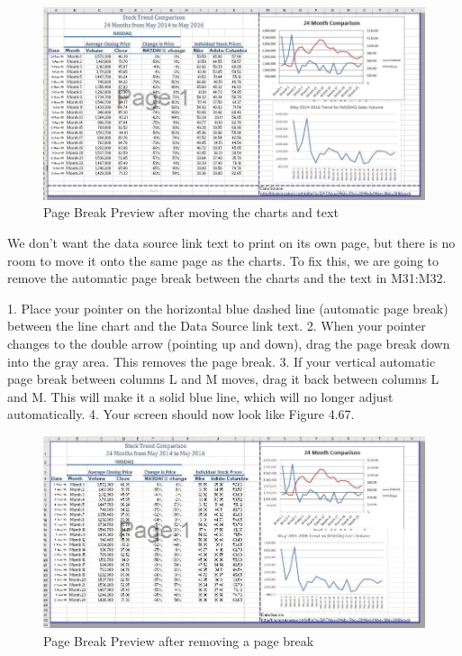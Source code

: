 \begin{figure}[H]
	\centering
	\includegraphics[width=\maxwidth{.95\linewidth}]{gfx/ch04_fig53}
	\caption{Page Break Preview after moving the charts and text}
	\label{04:fig53}
\end{figure}




We don’t want the data source link text to print on its own page, but there is no room to move it onto
the same page as the charts. To fix this, we are going to remove the automatic page break between the
charts and the text in M31:M32.

1. Place your pointer on the horizontal blue dashed line (automatic page break) between the line
chart and the Data Source link text.
2. When your pointer changes to the double arrow (pointing up and down), drag the page break
down into the gray area. This removes the page break.
3. If your vertical automatic page break between columns L and M moves, drag it back between
columns L and M. This will make it a solid blue line, which will no longer adjust automatically.
4. Your screen should now look like Figure 4.67.



\begin{figure}[H]
	\centering
	\includegraphics[width=\maxwidth{.95\linewidth}]{gfx/ch04_fig54}
	\caption{Page Break Preview after removing a page break}
	\label{04:fig54}
\end{figure}

